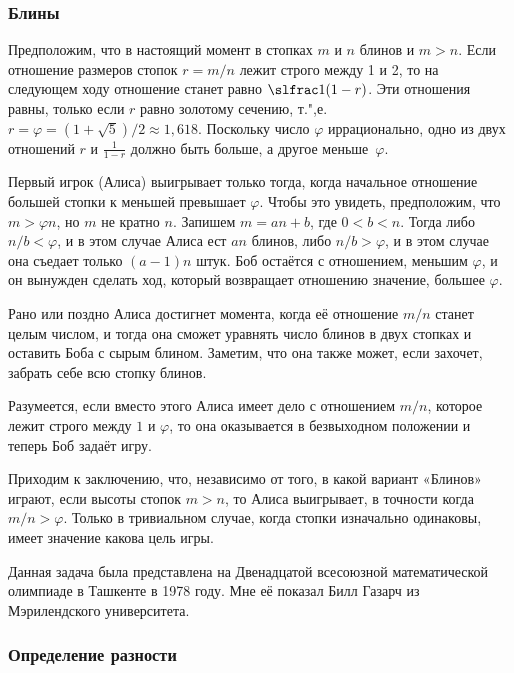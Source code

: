 \documentclass[twoside]{book}
\begin{document}
\subsubsection*{Блины}%

Предположим, что в настоящий момент в стопках $m$ и $n$ блинов и $m > n$.
Если отношение размеров стопок $r = m/n$ лежит строго между 1 и 2, то на следующем ходу отношение станет равно $\slfrac1{(1-r)}$.
Эти отношения равны, только если $r$ равно золотому сечению,
т.",е. $r=\varphi=(1+\sqrt{5})/2\approx 1{,}618$.
Поскольку число $\varphi$ иррационально, одно из двух отношений $r$ и $\tfrac1{1-r}$ должно быть больше, а другое меньше~$\varphi$.

Первый игрок (Алиса) выигрывает только тогда, когда начальное отношение большей стопки к меньшей превышает $\varphi$.
Чтобы это увидеть, предположим, что $m>\varphi n$, но $m$ не кратно $n$.
Запишем $m=an+b$, где $0<b<n$.
Тогда либо $n/b<\varphi$, и в этом случае Алиса ест $an$ блинов, либо $n/b>\varphi$, и в этом случае она съедает только $(a-1)n$ штук.
Боб остаётся с отношением, меньшим $\varphi$, и он вынужден сделать ход, который возвращает отношению значение, большее $\varphi$.

Рано или поздно Алиса достигнет момента, когда её отношение $m/n$ станет целым числом, и тогда она сможет уравнять число блинов в двух стопках и оставить Боба с сырым блином.
Заметим, что она также может, если захочет, забрать себе всю стопку блинов.

Разумеется, если вместо этого Алиса имеет дело с отношением $m/n$, которое лежит строго между $1$ и $\varphi$, то она оказывается в безвыходном положении %
и теперь Боб задаёт игру.

Приходим к заключению, что, независимо от того, в какой вариант «Блинов» играют, если высоты стопок $m>n$, то Алиса выигрывает, в точности когда $m/n>\varphi$.
Только в тривиальном случае, когда стопки изначально одинаковы, имеет значение какова цель игры.\heart

Данная задача была представлена на Двенадцатой всесоюзной математической олимпиаде в Ташкенте в 1978 году.
Мне её показал Билл Газарч из Мэрилендского университета.%

\subsubsection*{Определение разности}%
\end{document}
